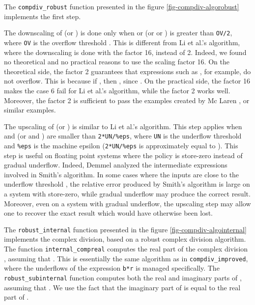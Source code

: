 \documentclass{paper}
\newcommand{\scivar}[1]{\texttt{#1}}
\begin{document}
The \scivar{compdiv\_robust} function presented in the figure \ref{fig-compdiv-algorobust}
implements the first step.

The downscaling of  (or ) is done only when 
 or  (or  or ) is greater than \scivar{OV/2}, where 
\scivar{OV} is the overflow threshold . 
This is different from Li et al.'s algorithm, where the downscaling 
is done with the factor 16, instead of 2. 
Indeed, we found no theoretical and no practical reasons to 
use the scaling factor 16. 
On the theoretical side, the factor 2 guarantees that 
expressions such as , for example, do not overflow. 
This is because if , then , 
since . 
On the practical side, the factor 16 makes the case 6 fail for 
Li et al.'s algorithm, while the factor 2 works well. 
Moreover, the factor 2 is sufficient to pass the examples created 
by Mc Laren \cite{McLaren2009}, or similar examples. 

The upscaling of  (or ) is similar to Li et al.'s algorithm. 
This step applies when  and  (or  and ) 
are smaller than \scivar{2*UN/\%eps}, where \scivar{UN} is the 
underflow threshold  and \scivar{\%eps} is the machine epsilon  
(\scivar{2*UN/\%eps} is approximately equal to ). 
This step is useful on floating point systems where 
the policy is store-zero instead of gradual underflow. 
Indeed, Demmel analyzed \cite{Dem84,DemmelPC2011} the intermediate expressions 
involved in Smith's algorithm. 
In some cases where the inputs are close to the underflow threshold , 
the relative error produced by Smith's algorithm is large on a 
system with store-zero, while gradual underflow may produce the 
correct result. 
Moreover, even on a system with gradual underflow, the upscaling step 
may allow one to recover the exact result which would have otherwise been lost. 

The \scivar{robust\_internal} function presented in the figure 
\ref{fig-compdiv-algointernal} implements the complex division, based 
on a robust complex division algorithm. 
The function \scivar{internal\_compreal} computes the real 
part of the complex division , assuming that 
. 
This is essentially the same algorithm as in \scivar{compdiv\_improved}, 
where the underflows of the expression \scivar{b*r} is managed specifically. 
The \scivar{robust\_subinternal} function computes both the 
real and imaginary parts of , assuming that 
. 
We use the fact that the imaginary part of  is 
equal to the real part of . 
\end{document}
